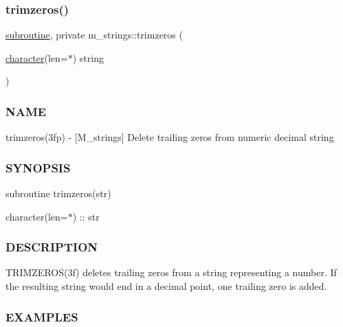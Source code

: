 \subsubsection{\texorpdfstring{trimzeros()}{trimzeros()}}
{\footnotesize\ttfamily \hyperlink{M__stopwatch_83_8txt_acfbcff50169d691ff02d4a123ed70482}{subroutine}, private m\+\_\+strings\+::trimzeros (\begin{DoxyParamCaption}\item[{\hyperlink{option__stopwatch_83_8txt_abd4b21fbbd175834027b5224bfe97e66}{character}(len=$\ast$)}]{string }\end{DoxyParamCaption})\hspace{0.3cm}{\ttfamily [private]}}



\subsubsection*{N\+A\+ME}

trimzeros(3fp) -\/ \mbox{[}M\+\_\+strings\mbox{]} Delete trailing zeros from numeric decimal string \subsubsection*{S\+Y\+N\+O\+P\+S\+IS}

subroutine trimzeros(str)

character(len=$\ast$) \+:\+: str \subsubsection*{D\+E\+S\+C\+R\+I\+P\+T\+I\+ON}

T\+R\+I\+M\+Z\+E\+R\+O\+S(3f) deletes trailing zeros from a string representing a number. If the resulting string would end in a decimal point, one trailing zero is added. \subsubsection*{E\+X\+A\+M\+P\+L\+ES}

